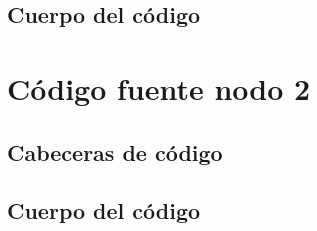 \documentclass[a4paper,oneside,12pt]{article}
\begin{document}
\subsection{Cuerpo del código}




\section{Código fuente nodo 2}
\subsection{Cabeceras de código}


\subsection{Cuerpo del código}


\end{document}
